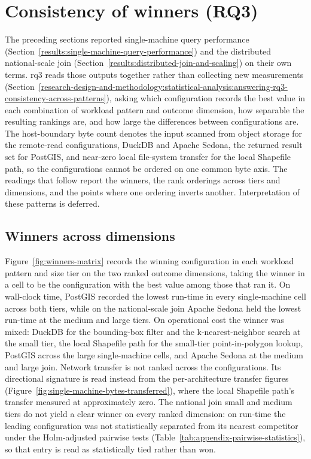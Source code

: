 \section{Consistency of winners (RQ3)}
\label{results:consistency-of-winners}

The preceding sections reported single-machine query performance (Section~\ref{results:single-machine-query-performance}) and the distributed national-scale join (Section~\ref{results:distributed-join-and-scaling}) on their own terms. \acrshort{rq}3 reads those outputs together rather than collecting new measurements (Section~\ref{research-design-and-methodology:statistical-analysis:answering-rq3-consistency-across-patterns}), asking which configuration records the best value in each combination of workload pattern and outcome dimension, how separable the resulting rankings are, and how large the differences between configurations are. The host-boundary byte count denotes the input scanned from object storage for the remote-read configurations, DuckDB and Apache Sedona, the returned result set for PostGIS, and near-zero local file-system transfer for the local Shapefile path, so the configurations cannot be ordered on one common byte axis. The readings that follow report the winners, the rank orderings across tiers and dimensions, and the points where one ordering inverts another. Interpretation of these patterns is deferred.

\subsection{Winners across dimensions}
\label{results:consistency-of-winners:winners-across-dimensions}

Figure~\ref{fig:winners-matrix} records the winning configuration in each workload pattern and size tier on the two ranked outcome dimensions, taking the winner in a cell to be the configuration with the best value among those that ran it. On wall-clock time, PostGIS recorded the lowest run-time in every single-machine cell across both tiers, while on the national-scale join Apache Sedona held the lowest run-time at the medium and large tiers. On operational cost the winner was mixed: DuckDB for the bounding-box filter and the k-nearest-neighbor search at the small tier, the local Shapefile path for the small-tier point-in-polygon lookup, PostGIS across the large single-machine cells, and Apache Sedona at the medium and large join. Network transfer is not ranked across the configurations. Its directional signature is read instead from the per-architecture transfer figures (Figure~\ref{fig:single-machine-bytes-transferred}), where the local Shapefile path's transfer measured at approximately zero. The national join small and medium tiers do not yield a clear winner on every ranked dimension: on run-time the leading configuration was not statistically separated from its nearest competitor under the Holm-adjusted pairwise tests (Table~\ref{tab:appendix-pairwise-statistics}), so that entry is read as statistically tied rather than won.

